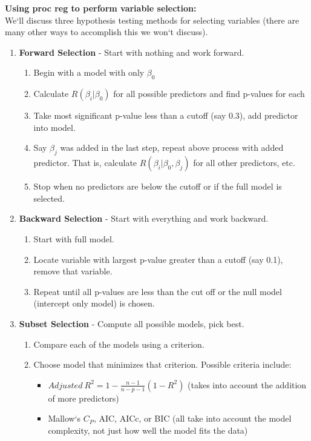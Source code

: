 \documentclass{article}
\begin{document}
\newpage
\textbf{Using proc reg to perform variable selection:}\\
We`ll discuss three hypothesis testing methods for selecting variables (there are many other ways to accomplish this we won`t discuss).
\begin{enumerate}
\item \textbf{Forward Selection} - Start with nothing and work forward.
	\begin{enumerate}
		\item Begin with a model with only $\beta_0$
		\item Calculate $R(\beta_i|\beta_0)$ for all possible predictors and find p-values for each
		\item Take most significant p-value less than a cutoff (say 0.3), add predictor into model.  
		\item Say $\beta_j$ was added in the last step, repeat above process with added predictor.  That is, calculate $R(\beta_i|\beta_0,\beta_j)$ for all other predictors, etc.
		\item Stop when no predictors are below the cutoff or if the full model is selected.
	\end{enumerate}
\item \textbf{Backward Selection} - Start with everything and work backward. 
\begin{enumerate}
		\item Start with full model.
		\item Locate variable with largest p-value greater than a cutoff (say 0.1), remove that variable.
		\item Repeat until all p-values are less than the cut off or the null model (intercept only model) is chosen.
	\end{enumerate}
\item \textbf{Subset Selection} - Compute all possible models, pick best.
\begin{enumerate}
		\item Compare each of the models using a criterion.
		\item Choose model that minimizes that criterion.  Possible criteria include:
		\begin{itemize}
			\item $Adjusted~R^2 = 1-\frac{n-1}{n-p-1}(1-R^2)$ (takes into account the addition of more predictors)
			\item Mallow`s $C_P$, AIC, AICc, or BIC (all take into account the model complexity, not just how well the model fits the data)
		\end{itemize}
	\end{enumerate}
\end{enumerate}
\end{document}
